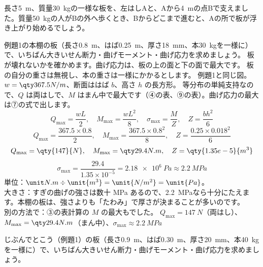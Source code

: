 \begin{jibun}
長さ\qty{5}{m}、質量\qty{30}{kg}の一様な板を、左はしAと、Aから\qty{4}{m}の点Bで支えました。質量\qty{50}{kg}の人がBの外へ歩くとき、Bからどこまで進むと、Aの所で板が浮き上がり始めるでしょう。
\end{jibun}

\begin{phreidai}
\label{ph:力-10:ex5}例題1の本棚の板（長さ\qty{0.8}{m}、はば\qty{0.25}{m}、厚さ\qty{18}{mm}、本\qty{30}{kg}を一様に）で、いちばん大きいせん断力・曲げモーメント・曲げ応力を求めましょう。
\phbamen
板が壊れないかを確かめます。曲げ応力は、板の上の面と下の面で最大です。
\phmushi
板の自分の重さは無視し、本の重さは一様にかかるとします。
\phzu
例題1と同じ図。$w=\pxkq{367.5}{N/m}$、断面ははば $b$、高さ $h$ の長方形。
\phriyu
等分布の単純支持なので、$Q$ は両はしで、$M$ はまん中で最大です（④の表、⑨の表）。曲げ応力の最大は⑦の式で出します。
\[Q_{\max}=\frac{wL}{2},\quad M_{\max}=\frac{wL^2}{8},\quad\sigma_{\max}=\frac{M}{Z},\quad Z=\frac{bh^2}{6}\]
\phtateru
\[ Q_{\max}=\frac{367.5\times0.8}{2},\quad M_{\max}=\frac{367.5\times0.8^2}{8},\quad Z=\frac{0.25\times0.018^2}{6} \]
\phtoku
\[ Q_{\max}=\qty{147}{N},\quad M_{\max}=\pxkq{29.4}{N.m},\quad Z=\qty{1.35e-5}{m^3} \]
\[ \sigma_{\max}=\frac{29.4}{1.35\times10^{-5}}=\qty{2.18e6}{Pa}\approx\qty{2.2}{MPa} \]
\phtashikame
単位：$\pxku{N.m}\div\unit{m^3}=\unit{N/m^2}=\unit{Pa}$。\\
大きさ：すぎの曲げの強さは数十 MPa あるので、\qty{2.2}{MPa}なら十分にたえます。本棚の板は、強さよりも「たわみ」で厚さが決まることが多いのです。\\
別の方法で：③の表計算の $M$ の最大もでした。
\kotae $Q_{\max}=\qty{147}{N}$（両はし）、$M_{\max}=\pxkq{29.4}{N.m}$（まん中）、$\sigma_{\max}\approx\qty{2.2}{MPa}$
\end{phreidai}
\begin{jibun}
じぶんでとこう（例題1）の板（長さ\qty{0.9}{m}、はば\qty{0.30}{m}、厚さ\qty{20}{mm}、本\qty{40}{kg}を一様に）で、いちばん大きいせん断力・曲げモーメント・曲げ応力を求めましょう。
\end{jibun}

